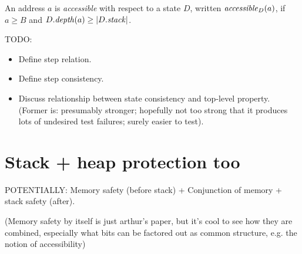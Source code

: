 \documentclass[conference]{IEEEtran}
\begin{document}
An address $a$ is \emph{accessible} with respect to a state $D$, written $\relax{\it accessible}_{D}({a})$, if
$a \geq B$ and ${D}.\relax{\it depth}({a}) \geq \lvert{{D}.\relax{\it stack}}\rvert$.


TODO:
\begin{itemize}
\item
  Define step relation.
\item
  Define step consistency.
\item
  Discuss relationship between state consistency and top-level property.  (Former is: presumably stronger; hopefully not
  too strong that it produces lots of undesired test failures; surely easier to test).

\end{itemize}


\iftext
\section{Stack + heap protection too}

POTENTIALLY: Memory safety (before stack) + Conjunction of memory + stack
safety (after).

(Memory safety by itself is just arthur’s paper, but it’s cool to see how
they are combined, especially what bits can be factored out as common
structure, e.g. the notion of accessibility)
\fi
\end{document}
